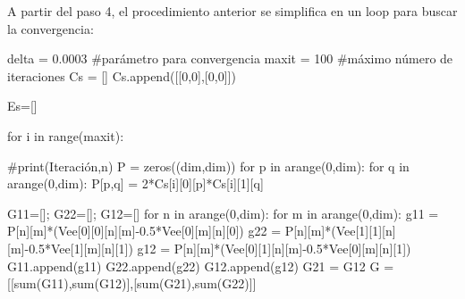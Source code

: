 \documentclass[
  letterpaper,
  DIV=11,
  numbers=noendperiod]{scrreprt}
\newenvironment{Shaded}{\begin{snugshade}}{\end{snugshade}}
\newcommand{\BuiltInTok}[1]{\textcolor[rgb]{0.00,0.23,0.31}{#1}}
\newcommand{\CommentTok}[1]{\textcolor[rgb]{0.37,0.37,0.37}{#1}}
\newcommand{\ControlFlowTok}[1]{\textcolor[rgb]{0.00,0.23,0.31}{#1}}
\newcommand{\DecValTok}[1]{\textcolor[rgb]{0.68,0.00,0.00}{#1}}
\newcommand{\FloatTok}[1]{\textcolor[rgb]{0.68,0.00,0.00}{#1}}
\newcommand{\KeywordTok}[1]{\textcolor[rgb]{0.00,0.23,0.31}{#1}}
\newcommand{\NormalTok}[1]{\textcolor[rgb]{0.00,0.23,0.31}{#1}}
\newcommand{\OperatorTok}[1]{\textcolor[rgb]{0.37,0.37,0.37}{#1}}
\begin{document}
A partir del paso 4, el procedimiento anterior se simplifica en un loop
para buscar la convergencia:

\begin{Shaded}
\begin{Highlighting}[]
\NormalTok{delta }\OperatorTok{=} \FloatTok{0.0003} \CommentTok{\#parámetro para convergencia}
\NormalTok{maxit }\OperatorTok{=} \DecValTok{100} \CommentTok{\#máximo número de iteraciones}
\NormalTok{Cs }\OperatorTok{=}\NormalTok{ []}
\NormalTok{Cs.append([[}\DecValTok{0}\NormalTok{,}\DecValTok{0}\NormalTok{],[}\DecValTok{0}\NormalTok{,}\DecValTok{0}\NormalTok{]])}

\NormalTok{Es}\OperatorTok{=}\NormalTok{[]}

\ControlFlowTok{for}\NormalTok{ i }\KeywordTok{in} \BuiltInTok{range}\NormalTok{(maxit):}
    
    \CommentTok{\#print(\textquotesingle{}Iteración\textquotesingle{},n)}
\NormalTok{    P }\OperatorTok{=}\NormalTok{ zeros((dim,dim))}
    \ControlFlowTok{for}\NormalTok{ p }\KeywordTok{in}\NormalTok{ arange(}\DecValTok{0}\NormalTok{,dim):}
        \ControlFlowTok{for}\NormalTok{ q }\KeywordTok{in}\NormalTok{ arange(}\DecValTok{0}\NormalTok{,dim):}
\NormalTok{            P[p,q] }\OperatorTok{=} \DecValTok{2}\OperatorTok{*}\NormalTok{Cs[i][}\DecValTok{0}\NormalTok{][p]}\OperatorTok{*}\NormalTok{Cs[i][}\DecValTok{1}\NormalTok{][q]}
            
\NormalTok{    G11}\OperatorTok{=}\NormalTok{[]}\OperatorTok{;}\NormalTok{ G22}\OperatorTok{=}\NormalTok{[]}\OperatorTok{;}\NormalTok{ G12}\OperatorTok{=}\NormalTok{[]}
    \ControlFlowTok{for}\NormalTok{ n }\KeywordTok{in}\NormalTok{ arange(}\DecValTok{0}\NormalTok{,dim):}
        \ControlFlowTok{for}\NormalTok{ m }\KeywordTok{in}\NormalTok{ arange(}\DecValTok{0}\NormalTok{,dim):}
\NormalTok{            g11 }\OperatorTok{=}\NormalTok{ P[n][m]}\OperatorTok{*}\NormalTok{(Vee[}\DecValTok{0}\NormalTok{][}\DecValTok{0}\NormalTok{][n][m]}\OperatorTok{{-}}\FloatTok{0.5}\OperatorTok{*}\NormalTok{Vee[}\DecValTok{0}\NormalTok{][m][n][}\DecValTok{0}\NormalTok{])}
\NormalTok{            g22 }\OperatorTok{=}\NormalTok{ P[n][m]}\OperatorTok{*}\NormalTok{(Vee[}\DecValTok{1}\NormalTok{][}\DecValTok{1}\NormalTok{][n][m]}\OperatorTok{{-}}\FloatTok{0.5}\OperatorTok{*}\NormalTok{Vee[}\DecValTok{1}\NormalTok{][m][n][}\DecValTok{1}\NormalTok{])}
\NormalTok{            g12 }\OperatorTok{=}\NormalTok{ P[n][m]}\OperatorTok{*}\NormalTok{(Vee[}\DecValTok{0}\NormalTok{][}\DecValTok{1}\NormalTok{][n][m]}\OperatorTok{{-}}\FloatTok{0.5}\OperatorTok{*}\NormalTok{Vee[}\DecValTok{0}\NormalTok{][m][n][}\DecValTok{1}\NormalTok{])}
\NormalTok{            G11.append(g11)}
\NormalTok{            G22.append(g22)}
\NormalTok{            G12.append(g12)}
\NormalTok{    G21 }\OperatorTok{=}\NormalTok{ G12}
\NormalTok{    G }\OperatorTok{=}\NormalTok{ [[}\BuiltInTok{sum}\NormalTok{(G11),}\BuiltInTok{sum}\NormalTok{(G12)],[}\BuiltInTok{sum}\NormalTok{(G21),}\BuiltInTok{sum}\NormalTok{(G22)]]}


\end{Highlighting}
\end{Shaded}
\end{document}
